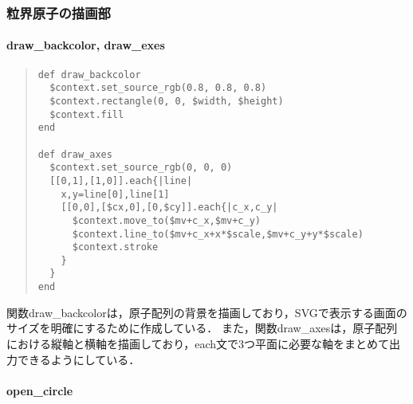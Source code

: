 \subsubsection{粒界原子の描画部}
\paragraph{draw\_backcolor, draw\_exes}\begin{quote}\begin{verbatim}
def draw_backcolor
  $context.set_source_rgb(0.8, 0.8, 0.8)
  $context.rectangle(0, 0, $width, $height)
  $context.fill
end

def draw_axes
  $context.set_source_rgb(0, 0, 0)
  [[0,1],[1,0]].each{|line|
    x,y=line[0],line[1]
    [[0,0],[$cx,0],[0,$cy]].each{|c_x,c_y|
      $context.move_to($mv+c_x,$mv+c_y)
      $context.line_to($mv+c_x+x*$scale,$mv+c_y+y*$scale)
      $context.stroke
    }
  }
end
\end{verbatim}\end{quote}
関数draw\_backcolorは，原子配列の背景を描画しており，SVGで表示する画面のサイズを明確にするために作成している．
また，関数draw\_axesは，原子配列における縦軸と横軸を描画しており，each文で3つ平面に必要な軸をまとめて出力できるようにしている．

\paragraph{open\_circle}
